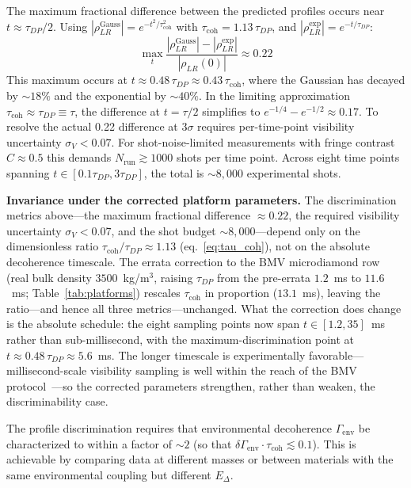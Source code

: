 \documentclass[12pt,a4paper]{article}
\theoremstyle{remark}
\begin{document}
The maximum fractional difference between the predicted profiles occurs near
$t \approx \tau_{DP}/2$. Using $|\rho_{LR}^{\text{Gauss}}| = e^{-t^2/\tau_{\text{coh}}^2}$
with $\tau_{\text{coh}} = 1.13\,\tau_{DP}$, and
$|\rho_{LR}^{\text{exp}}| = e^{-t/\tau_{DP}}$:
\begin{equation}
\max_t\frac{|\rho_{LR}^{\text{Gauss}}| - |\rho_{LR}^{\text{exp}}|}{|\rho_{LR}(0)|}
\approx 0.22
\label{eq:delta_V}
\end{equation}
This maximum occurs at $t \approx 0.48\,\tau_{DP} \approx 0.43\,\tau_{\text{coh}}$,
where the Gaussian has decayed by $\sim18\%$ and the exponential by $\sim40\%$.
In the limiting approximation $\tau_{\text{coh}} \approx \tau_{DP} \equiv \tau$,
the difference at $t = \tau/2$ simplifies to $e^{-1/4} - e^{-1/2} \approx 0.17$.
To resolve the actual 0.22 difference at $3\sigma$ requires per-time-point visibility
uncertainty $\sigma_V < 0.07$. For shot-noise-limited measurements with fringe contrast
$C \approx 0.5$ this demands $N_{\text{run}} \gtrsim 1000$ shots per time point. Across
eight time points spanning $t \in [0.1\tau_{DP}, 3\tau_{DP}]$, the total is
$\sim 8{,}000$ experimental shots.

\textbf{Invariance under the corrected platform parameters.} The discrimination metrics
above---the maximum fractional difference $\approx 0.22$, the required visibility
uncertainty $\sigma_V < 0.07$, and the shot budget $\sim 8{,}000$---depend only on the
dimensionless ratio $\tau_{\text{coh}}/\tau_{DP} \approx 1.13$ (eq.~\eqref{eq:tau_coh}), not
on the absolute decoherence timescale. The errata correction to the BMV microdiamond row
(real bulk density $3500$~kg/m$^3$, raising $\tau_{DP}$ from the pre-errata $1.2$~ms to
$11.6$~ms; Table~\ref{tab:platforms}) rescales $\tau_{\text{coh}}$ in proportion
($13.1$~ms), leaving the ratio---and hence all three metrics---unchanged. What the
correction does change is the absolute schedule: the eight sampling points now span
$t \in [1.2, 35]$~ms rather than sub-millisecond, with the maximum-discrimination point at
$t \approx 0.48\,\tau_{DP} \approx 5.6$~ms. The longer timescale is experimentally
favorable---millisecond-scale visibility sampling is well within the reach of the BMV
protocol~\cite{bose}---so the corrected parameters strengthen, rather than weaken, the
discriminability case.

The profile discrimination requires that environmental decoherence $\Gamma_{\text{env}}$
be characterized to within a factor of $\sim 2$ (so that $\delta\Gamma_{\text{env}}\cdot
\tau_{\text{coh}} \lesssim 0.1$). This is achievable by comparing data at different masses
or between materials with the same environmental coupling but different $E_\Delta$.
\end{document}
